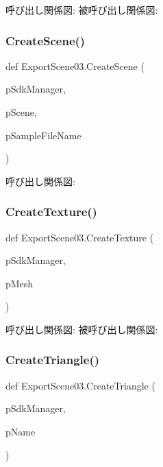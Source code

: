 呼び出し関係図\+:
被呼び出し関係図\+:
\mbox{\label{namespace_export_scene03_a046d5e67dee0735f097817fd9f265d98}} 
\subsubsection{\texorpdfstring{Create\+Scene()}{CreateScene()}}
{\footnotesize\ttfamily def Export\+Scene03.\+Create\+Scene (\begin{DoxyParamCaption}\item[{}]{p\+Sdk\+Manager,  }\item[{}]{p\+Scene,  }\item[{}]{p\+Sample\+File\+Name }\end{DoxyParamCaption})}

呼び出し関係図\+:
\mbox{\label{namespace_export_scene03_a31fdba5cdc721d7ab9f9e8ed00c60a1a}} 
\subsubsection{\texorpdfstring{Create\+Texture()}{CreateTexture()}}
{\footnotesize\ttfamily def Export\+Scene03.\+Create\+Texture (\begin{DoxyParamCaption}\item[{}]{p\+Sdk\+Manager,  }\item[{}]{p\+Mesh }\end{DoxyParamCaption})}

呼び出し関係図\+:
被呼び出し関係図\+:
\mbox{\label{namespace_export_scene03_a14b5c9490b1e23dea1de435163e84778}} 
\subsubsection{\texorpdfstring{Create\+Triangle()}{CreateTriangle()}}
{\footnotesize\ttfamily def Export\+Scene03.\+Create\+Triangle (\begin{DoxyParamCaption}\item[{}]{p\+Sdk\+Manager,  }\item[{}]{p\+Name }\end{DoxyParamCaption})}

